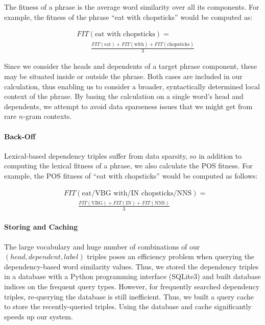 \documentclass[11pt]{article}
\begin{document}
The fitness of a phrase is the average word similarity over all its components.
For example, the fitness of the phrase ``eat with chopsticks'' would be computed as:

\begin{align}
& FIT(\mbox{eat with chopsticks}) = \nonumber \\
 & \qquad \frac{FIT(\mbox{eat}) + FIT(\mbox{with}) + FIT(\mbox{chopsticks})}{3}
\end{align}

Since we consider the heads and dependents of a target phrase component, these
may be situated  inside or outside the phrase. Both cases are included in our
calculation, thus enabling us to consider a broader, syntactically determined
local context of the phrase.
By basing the calculation on a single word's head and dependents, we attempt to 
avoid data sparseness issues that we might get from rare $n$-gram contexts.

\paragraph{Back-Off}
Lexical-based dependency triples suffer from data sparsity, so in addition to computing the lexical fitness of a phrase, we also calculate the POS fitness. For example, the POS fitness of ``eat with chopsticks'' would be computed as follows:

\begin{align}
& FIT(\mbox{eat/VBG with/IN chopsticks/NNS}) = \nonumber \\
 & \qquad \frac{FIT(\mbox{VBG}) + FIT(\mbox{IN}) + FIT(\mbox{NNS})}{3} 
\end{align}



\paragraph{Storing and Caching}
The large vocabulary and huge number of combinations of our $(head, dependent, label)$ triples poses an efficiency problem when querying the dependency-based word similarity values. Thus, we stored the dependency triples in a database with a Python programming interface (SQLite3) and built database indices on the frequent query types. However, for frequently searched dependency triples, re-querying the database is still inefficient. Thus, we built a query cache to store the recently-queried triples. Using the database and cache significantly speeds up our system. 
\end{document}
